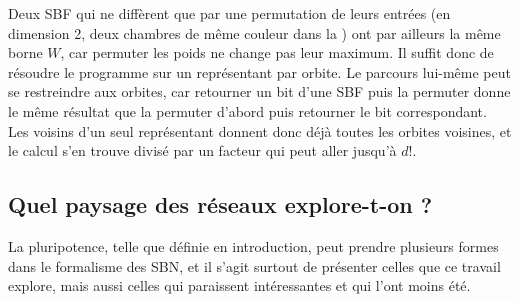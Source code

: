 \documentclass[12pt, a4paper]{article}
\begin{document}
Deux SBF qui ne diffèrent que par une permutation de leurs entrées (en dimension 2, deux chambres de même couleur dans la ) ont par ailleurs la même borne $W$, car permuter les poids ne change pas leur maximum.
Il suffit donc de résoudre le programme sur un représentant par orbite.
Le parcours lui-même peut se restreindre aux orbites, car retourner un bit d'une SBF puis la permuter donne le même résultat que la permuter d'abord puis retourner le bit correspondant.
Les voisins d'un seul représentant donnent donc déjà toutes les orbites voisines, et le calcul s'en trouve divisé par un facteur qui peut aller jusqu'à $d!$.

\subsection{Quel paysage des réseaux explore-t-on ?}
\label{sec:paysage}

La pluripotence, telle que définie en introduction, peut prendre plusieurs formes dans le formalisme des SBN, et il s'agit surtout de présenter celles que ce travail explore, mais aussi celles qui paraissent intéressantes et qui l'ont moins été.
\end{document}
